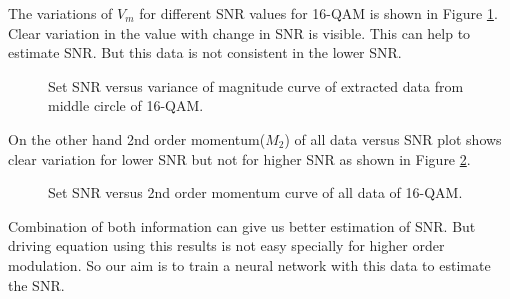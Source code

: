 \documentclass[12pt]{report}
\begin{document}
 The variations of $V_m$ for different SNR values for 16-QAM is shown in Figure \ref{fig:mmsVsSNR}. Clear variation in the value with change in SNR is visible. This can help to estimate SNR. But this data is not consistent in the lower SNR.
\begin{figure}[htbp]
	\caption{Set SNR versus variance of magnitude curve of extracted data from middle circle of 16-QAM.}
	\label{fig:mmsVsSNR}
\end{figure}
On the other hand 2nd order momentum($M_2$) of all data versus SNR plot shows clear variation for lower SNR but not for higher SNR as shown in Figure \ref{fig:m2sVsSNR}.  
\begin{figure}[htbp]
	\caption{Set SNR versus 2nd order momentum curve of all data of 16-QAM.}
	\label{fig:m2sVsSNR}
\end{figure}
Combination of both information can give us better estimation of SNR. But driving equation using this results is not easy specially for higher order modulation. So our aim is to train a neural network with this data to estimate the SNR.
\iffalse
\end{document}
